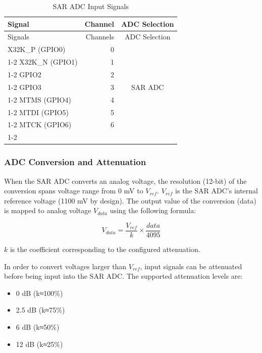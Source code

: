 \documentclass[main\_\_EN.tex]{subfiles}
\begin{document}
\begin{longtable}{ |p{2.5cm}|r|c| }
    \caption{SAR ADC Input Signals}
    \label{tab:sensor-sar-adc-input-signals}
    \\\hline
    \rowcolor{lightgray}
    Signal  & Channel  & ADC Selection \\ \hline
    \endfirsthead
    \hline
    \rowcolor{lightgray}  
    Signals  & Channels  & ADC Selection \\ \hline
    \endhead
    \hline
    \endfoot
    X32K\_P (GPIO0)       &  0  & \multirow{7}{*}{SAR ADC} \\ \cline{1-2}
    X32K\_N (GPIO1)       &  1  & \\ \cline{1-2}
    GPIO2         &  2  & \\ \cline{1-2}
    GPIO3         &  3  & \\ \cline{1-2}
    MTMS (GPIO4)          &  4  & \\ \cline{1-2}
    MTDI (GPIO5)          &  5  & \\ \cline{1-2}
    MTCK (GPIO6)          &  6  & \\ \cline{1-2}
\end{longtable}

\subsubsection{ADC Conversion and Attenuation}

When the SAR ADC converts an analog voltage, the resolution (12-bit) of the conversion spans voltage range from 0 mV to \(V_{ref}\). \(V_{ref}\) is the SAR ADC's internal reference voltage (1100 mV by design). The output value of the conversion (data) is mapped to analog voltage \(V_{data}\) using the following formula:

    \[
    V_{data} = \frac{V_{ref}}{k}\times{\frac{data}{4095}}
    \]

\(k\) is the coefficient corresponding to the configured attenuation.

In order to convert voltages larger than \(V_{ref}\), input signals can be attenuated before being input into the SAR ADC. The supported attenuation levels are:

\begin{itemize}
    \item 0 dB (k≈100\%)
    \item 2.5 dB (k≈75\%)
    \item 6 dB (k≈50\%)
    \item 12 dB (k≈25\%)
\end{itemize}
\end{document}
